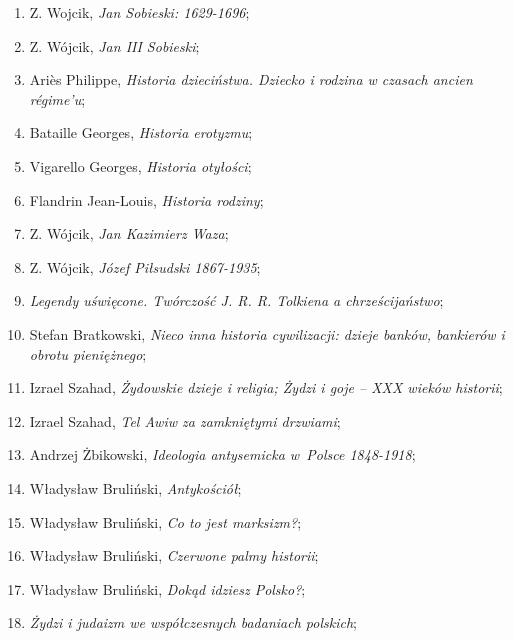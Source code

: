 \documentclass[a4paper,11pt]{article}
\begin{document}
\begin{enumerate}
\item Z. Wojcik, \textit{Jan Sobieski: 1629-1696};

\item Z. Wójcik, \textit{Jan III Sobieski};

\item Ariès Philippe, \textit{Historia dzieciństwa. Dziecko i rodzina w
    czasach ancien régime’u};

\item Bataille Georges, \textit{Historia erotyzmu};

\item Vigarello Georges, \textit{Historia otyłości};

\item Flandrin Jean-Louis, \textit{Historia rodziny};

\item Z. Wójcik, \textit{Jan Kazimierz Waza};

\item Z. Wójcik, \textit{Józef Piłsudski 1867-1935};

\item \textit{Legendy uświęcone. Twórczość J. R. R. Tolkiena a
    chrześcijaństwo};

\item Stefan Bratkowski, \textit{Nieco inna historia cywilizacji: dzieje
    banków, bankierów i obrotu pieniężnego};

\item Izrael Szahad, \textit{Żydowskie dzieje i religia; Żydzi i goje –
    XXX wieków historii};

\item Izrael Szahad, \textit{Tel Awiw za zamkniętymi drzwiami};

\item Andrzej Żbikowski, \textit{Ideologia antysemicka w~Polsce
    1848-1918};

\item Władysław Bruliński, \textit{Antykościół};

\item Władysław Bruliński, \textit{Co to jest marksizm?};

\item Władysław Bruliński, \textit{Czerwone palmy historii};

\item Władysław Bruliński, \textit{Dokąd idziesz Polsko?};

\item \textit{Żydzi i judaizm we współczesnych badaniach polskich};


\end{enumerate}
\end{document}
